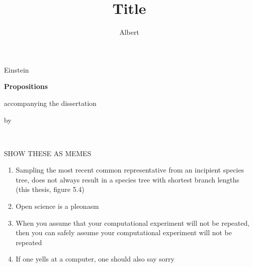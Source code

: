 \documentclass{dissertation}
\begin{document}
\title[Optional Subtitle]{Title}
\author{Albert}{Einstein}

\begin{center}

{\Large\titlefont\bfseries Propositions}

\bigskip

accompanying the dissertation

\bigskip

{\makeatletter
\titlestyle\bfseries\large\@title
\makeatother}

{\makeatletter
\ifx\@subtitle\undefined\else
    \titlefont\titleshape\@subtitle
\fi
\makeatother}

\bigskip

by

\bigskip

\makeatletter
{\large\titlefont\bfseries\@firstname\ {\titleshape\@lastname}}
\makeatother

\end{center}

\bigskip
\bigskip

SHOW THESE AS MEMES

\begin{enumerate}

\item Sampling the most recent common representative from an incipient
      species tree, does not always result in a species tree with shortest
      branch lengths (this thesis, figure 5.4)
\item Open science is a pleonasm
\item When you assume that your computational experiment will not be repeated,
      then you can safely assume your computational experiment will not be repeated
\item If one yells at a computer, one should also say sorry
\end{enumerate}
\end{document}
